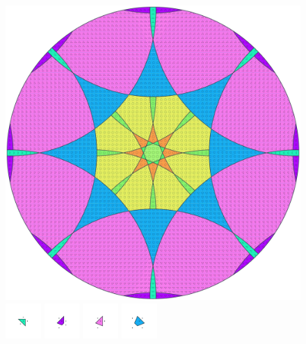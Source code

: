 \documentclass[text.tex]{subfiles}
\begin{document}
\clearpage
\pagestyle{fancy}
\fancyhf{}
\begin{figure}[h!]
\centering
\includegraphics[width=1\textwidth]{img/results/circle8/circle8_174302_(10067_-4167alpha_4).pdf}
\includegraphics[width=0.12\textwidth]{img/results/circle8/circle8_174302_(10067_-4167alpha_4)_001.pdf}
\includegraphics[width=0.12\textwidth]{img/results/circle8/circle8_174302_(10067_-4167alpha_4)_002.pdf}
\includegraphics[width=0.12\textwidth]{img/results/circle8/circle8_174302_(10067_-4167alpha_4)_003.pdf}
\includegraphics[width=0.12\textwidth]{img/results/circle8/circle8_174302_(10067_-4167alpha_4)_004.pdf}

\end{figure}
\end{document}
